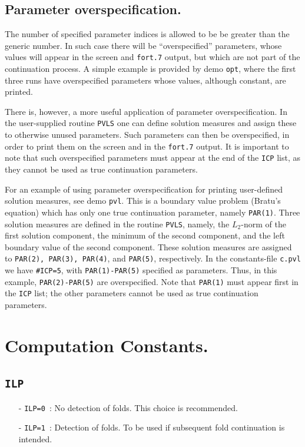 \documentclass[12pt]{report}
\begin{document}
\subsection{ Parameter overspecification.} \label{sec:Parameter_over_specification}
The number of specified parameter indices is allowed to be be greater 
than the generic number.
In such case there will be ``overspecified'' parameters, whose values
will appear in the screen and {\tt fort.7} output, but which are not
part of the continuation process.
A simple example is provided by demo {\tt opt}, where the first three runs
have overspecified parameters whose values, although constant, are printed.

There is, however, a more useful application of parameter overspecification.
In the user-supplied routine {\tt PVLS} one can define solution measures
and assign these to otherwise unused parameters.
Such parameters can then be overspecified, in order to print them
on the screen and in the {\tt fort.7} output.
It is important to note that such overspecified parameters must appear
at the end of the {\tt ICP} list, as they cannot be used as true continuation
parameters.

For an example of using parameter overspecification for printing user-defined
solution measures, see demo {\tt pvl}.
This is a boundary value problem (Bratu's equation) which has
only one true continuation parameter, namely {\tt PAR(1)}.
Three solution measures are defined in the routine {\tt PVLS}, namely,
the $L_2$-norm of the first solution component,
the minimum of the second component, and
the left boundary value of the second component.
These solution measures are assigned to {\tt PAR(2), PAR(3), PAR(4)},
and {\tt PAR(5)}, respectively.
In the constants-file {\tt c.pvl} we have {\tt \#ICP=5},
with {\tt PAR(1)-PAR(5)} specified as parameters.
Thus, in this example, {\tt PAR(2)-PAR(5)} are overspecified.
Note that {\tt PAR(1)} must appear first in the {\tt ICP} list;
the other parameters cannot be used as true continuation parameters.
\section{ Computation Constants.} \label{sec:Computation_constants}
\subsection{\texttt{ILP}}  \label{sec:ILP}
\begin{itemize}
\item[-] {\tt ILP=0}~: 
  No detection of folds. This choice is recommended.
\item[-] {\tt ILP=1}~: 
  Detection of folds. To be used if subsequent fold continuation is intended.
\end{itemize}
\end{document}
